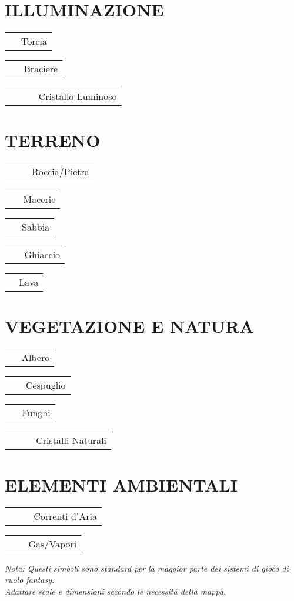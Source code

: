 \documentclass[11pt]{article}
\makeatletter
\newcommand{\mapsymbol}[2][1]{%
  \begin{tikzpicture}[scale=#1, baseline=-0.3ex]
    #2
  \end{tikzpicture}%
}
\newcommand{\legendentry}[2]{%
  \noindent\begin{minipage}{\linewidth}
    \begin{tabular}{@{}c@{\hspace{8pt}}p{0.75\linewidth}@{}}
      \raisebox{-0.3ex}{#1} & #2 \\
    \end{tabular}
  \end{minipage}
  \vspace{3pt}
}
\newcommand{\dmushroom}{%
  \mapsymbol{
    \draw[thick] (0.5,0.2) -- (0.5,0.5);
    \draw[thick] (0.35,0.5) to[bend left=40] (0.65,0.5);
    \fill[brown] (0.5,0.5) circle (0.02);
  }
}
\newcommand{\dcrystalcluster}{%
  \mapsymbol{
    \draw[thick] (0.4,0.3) -- (0.35,0.6) -- (0.45,0.7) -- (0.5,0.4) -- cycle;
    \draw[thick] (0.5,0.3) -- (0.45,0.6) -- (0.55,0.7) -- (0.6,0.4) -- cycle;
    \draw[thick] (0.6,0.3) -- (0.55,0.6) -- (0.65,0.7) -- (0.7,0.4) -- cycle;
  }
}
\newcommand{\dwind}{%
  \mapsymbol{
    \draw[thick,->] (0.1,0.5) to[bend left=20] (0.9,0.5);
    \draw[thick,->] (0.1,0.4) to[bend left=15] (0.7,0.4);
    \draw[thick,->] (0.1,0.6) to[bend left=15] (0.7,0.6);
  }
}
\newcommand{\dgas}{%
  \mapsymbol{
    \fill[yellow!30] (0.2,0.2) rectangle (0.8,0.8);
    \draw[green,decorate,decoration={snake,amplitude=0.3mm}] (0.25,0.3) -- (0.75,0.7);
    \draw[green,decorate,decoration={snake,amplitude=0.3mm}] (0.25,0.7) -- (0.75,0.3);
  }
}
\newcommand{\dtorch}{%
  \mapsymbol{
    \draw[thick] (0.5,0.2) -- (0.5,0.6);
    \fill[orange] (0.5,0.6) circle (0.08);
    \foreach \angle in {0,72,144,216,288} {
      \draw[orange] (0.5,0.6) -- +(\angle:0.12);
    }
  }
}
\newcommand{\dbrazier}{%
  \mapsymbol{
    \draw[thick] (0.4,0.3) -- (0.4,0.5) -- (0.3,0.6) -- (0.7,0.6) -- (0.6,0.5) -- (0.6,0.3);
    \fill[orange] (0.5,0.6) circle (0.05);
  }
}
\newcommand{\dcrystal}{%
  \mapsymbol{
    \draw[thick] (0.5,0.2) -- (0.4,0.5) -- (0.5,0.8) -- (0.6,0.5) -- cycle;
    \foreach \angle in {0,60,120,180,240,300} {
      \draw[cyan] (0.5,0.5) -- +(\angle:0.08);
    }
  }
}
\newcommand{\drock}{%
  \mapsymbol{
    \fill[gray!50] (0.2,0.2) rectangle (0.8,0.8);
    \foreach \x in {0.3,0.5,0.7} {
      \foreach \y in {0.3,0.5,0.7} {
        \fill[gray!80] (\x,\y) circle (0.02);
      }
    }
  }
}
\newcommand{\drubble}{%
  \mapsymbol{
    \fill[gray!40] (0.2,0.2) rectangle (0.8,0.8);
    \foreach \x in {0.25,0.4,0.55,0.7} {
      \foreach \y in {0.25,0.45,0.65} {
        \fill[gray!70] (\x,\y) circle (0.03);
      }
    }
  }
}
\newcommand{\dsand}{%
  \mapsymbol{
    \fill[yellow!30] (0.2,0.2) rectangle (0.8,0.8);
    \foreach \x in {0.25,0.35,0.45,0.55,0.65,0.75} {
      \foreach \y in {0.25,0.35,0.45,0.55,0.65,0.75} {
        \fill[yellow!60] (\x,\y) circle (0.01);
      }
    }
  }
}
\newcommand{\dice}{%
  \mapsymbol{
    \fill[cyan!20] (0.2,0.2) rectangle (0.8,0.8);
    \draw[cyan] (0.25,0.3) -- (0.75,0.7);
    \draw[cyan] (0.3,0.25) -- (0.7,0.75);
    \draw[cyan] (0.75,0.3) -- (0.25,0.7);
  }
}
\newcommand{\dlava}{%
  \mapsymbol{
    \fill[red!60] (0.2,0.2) rectangle (0.8,0.8);
    \draw[orange,decorate,decoration={snake,amplitude=0.5mm}] (0.25,0.4) -- (0.75,0.4);
    \draw[orange,decorate,decoration={snake,amplitude=0.5mm}] (0.25,0.6) -- (0.75,0.6);
  }
}
\newcommand{\dtree}{%
  \mapsymbol{
    \draw[brown,thick] (0.5,0.2) -- (0.5,0.5);
    \fill[green!60] (0.5,0.6) circle (0.15);
  }
}
\newcommand{\dbush}{%
  \mapsymbol{
    \fill[green!50] (0.4,0.4) circle (0.08);
    \fill[green!50] (0.6,0.4) circle (0.08);
    \fill[green!50] (0.5,0.5) circle (0.08);
  }
}
\makeatother
\begin{document}
\begin{multicols}{2}
\section*{ILLUMINAZIONE}

\legendentry{\dtorch}{Torcia}
\legendentry{\dbrazier}{Braciere}
\legendentry{\dcrystal}{Cristallo Luminoso}

\section*{TERRENO}

\legendentry{\drock}{Roccia/Pietra}
\legendentry{\drubble}{Macerie}
\legendentry{\dsand}{Sabbia}
\legendentry{\dice}{Ghiaccio}
\legendentry{\dlava}{Lava}

\section*{VEGETAZIONE E NATURA}

\legendentry{\dtree}{Albero}
\legendentry{\dbush}{Cespuglio}
\legendentry{\dmushroom}{Funghi}
\legendentry{\dcrystalcluster}{Cristalli Naturali}

\section*{ELEMENTI AMBIENTALI}

\legendentry{\dwind}{Correnti d'Aria}
\legendentry{\dgas}{Gas/Vapori}

\end{multicols}

\vspace{1cm}

\begin{center}
\textit{Nota: Questi simboli sono standard per la maggior parte dei sistemi di gioco di ruolo fantasy. \\
Adattare scale e dimensioni secondo le necessità della mappa.}
\end{center}
\end{document}
